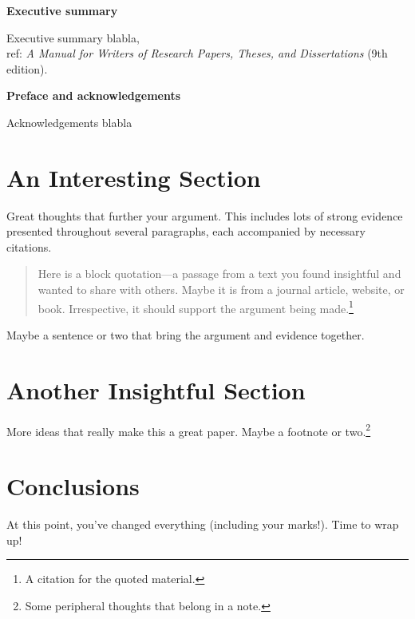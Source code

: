 \documentclass{turabian-researchpaper}
\begin{document}


\begin{center}
    {\normalsize \textbf{Executive summary}}
\end{center}
Executive summary blabla, \\
ref: \emph{A Manual for Writers of Research Papers, Theses, and Dissertations} (9th edition).

\newpage 

\begin{center}
    {\normalsize \textbf{Preface and acknowledgements}}
\end{center}
Acknowledgements blabla

\newpage 

\tableofcontents

\newpage 

\section{An Interesting Section}

Great thoughts that further your argument. This includes lots of strong evidence presented throughout several paragraphs, each accompanied by necessary citations.
\begin{quotation}
    \noindent Here is a block quotation---a passage from a text you found insightful and wanted to share with others. Maybe it is from a journal article, website, or book. Irrespective, it should support the argument being made.\footnote{A citation for the quoted material.}
\end{quotation}
Maybe a sentence or two that bring the argument and evidence together.\autocite[34]{example_source}


\section{Another Insightful Section}

More ideas that really make this a great paper. Maybe a footnote or two.\footnote{Some peripheral thoughts that belong in a note.}


\section{Conclusions}

At this point, you've changed everything (including your marks!). Time to wrap up!


\clearpage
\printbibliography
\end{document}
